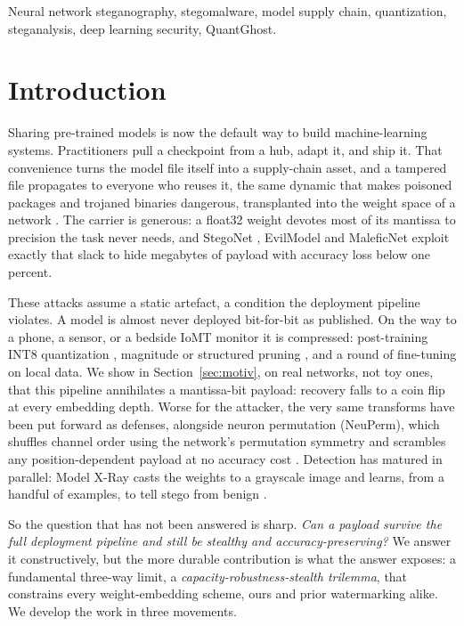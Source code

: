 \documentclass[10pt,journal]{IEEEtran}
\theoremstyle{remark}
\begin{document}
\begin{IEEEkeywords}
Neural network steganography, stegomalware, model supply chain, quantization, steganalysis, deep learning security, QuantGhost.
\end{IEEEkeywords}

\section{Introduction}\label{sec:intro}
Sharing pre-trained models is now the default way to build machine-learning systems.
Practitioners pull a checkpoint from a hub, adapt it, and ship it. That convenience
turns the model file itself into a supply-chain asset, and a tampered file propagates
to everyone who reuses it, the same dynamic that makes poisoned packages and
trojaned binaries dangerous, transplanted into the weight space of a network
\cite{gu2017badnets,liu2018trojaning,digregorio2026insecurity}. The carrier is generous: a float32
weight devotes most of its mantissa to precision the task never needs, and StegoNet
\cite{liu2020stegonet}, EvilModel \cite{wang2021evilmodel,wang2022evilmodel2} and
MaleficNet \cite{hitaj2022maleficnet,hitaj2025trust} exploit exactly that slack to
hide megabytes of payload with accuracy loss below one percent.

These attacks assume a static artefact, a condition the deployment pipeline violates. A
model is almost never deployed bit-for-bit as published. On the way to a phone, a sensor, or a bedside IoMT
monitor it is compressed: post-training INT8 quantization \cite{jacob2018quantization},
magnitude or structured pruning \cite{han2015learning,han2016deepcompression}, and a
round of fine-tuning on local data. We show in Section~\ref{sec:motiv}, on real
networks, not toy ones, that this pipeline annihilates a mantissa-bit payload:
recovery falls to a coin flip at every embedding depth. Worse for the attacker, the
very same transforms have been put forward as defenses, alongside neuron permutation
(NeuPerm), which shuffles channel order using the network's permutation symmetry and
scrambles any position-dependent payload at no accuracy cost
\cite{gilkarov2025neuperm}. Detection has matured in parallel: Model X-Ray casts the
weights to a grayscale image and learns, from a handful of examples, to tell stego
from benign \cite{gilkarov2026modelxray}.

So the question that has not been answered is sharp. \emph{Can a payload survive the
full deployment pipeline and still be stealthy and accuracy-preserving?} We answer it
constructively, but the more durable contribution is what the answer exposes: a
fundamental three-way limit, a \emph{capacity-robustness-stealth trilemma}, that
constrains every weight-embedding scheme, ours and prior watermarking alike. We develop
the work in three movements.
\end{document}
